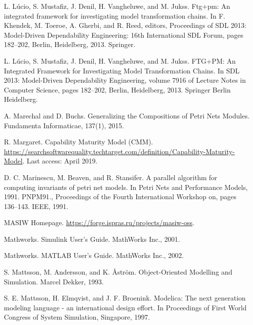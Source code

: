 \begin{description}[style=nextline,leftmargin=12mm,labelwidth=10mm,font=\normalfont]
\item[{[195]}] L. Lúcio, S. Mustafiz, J. Denil, H. Vangheluwe, and M. Jukss. Ftg+pm: An integrated framework for investigating model transformation chains. In F. Khendek, M. Toeroe, A. Gherbi, and R. Reed, editors, Proceedings of SDL 2013: Model-Driven Dependability Engineering: 16th International SDL Forum, pages 182–202, Berlin, Heidelberg, 2013. Springer.

\item[{[196]}] L. Lúcio, S. Mustafiz, J. Denil, H. Vangheluwe, and M. Jukss. FTG+PM: An Integrated Framework for Investigating Model Transformation Chains. In SDL 2013: Model-Driven Dependability Engineering, volume 7916 of Lecture Notes in Computer Science, pages 182–202, Berlin, Heidelberg, 2013. Springer Berlin Heidelberg.

\item[{[197]}] A. Marechal and D. Buchs. Generalizing the Compositions of Petri Nets Modules. Fundamenta Informaticae, 137(1), 2015.

\item[{[198]}] R. Margaret. Capability Maturity Model (CMM). \url{https://searchsoftwarequality.techtarget.com/definition/Capability-Maturity-Model}. Last access: April 2019.

\item[{[199]}] D. C. Marinescu, M. Beaven, and R. Stansifer. A parallel algorithm for computing invariants of petri net models. In Petri Nets and Performance Models, 1991. PNPM91., Proceedings of the Fourth International Workshop on, pages 136–143. IEEE, 1991.

\item[{[200]}] MASIW Homepage. \url{https://forge.ispras.ru/projects/masiw-oss}.

\item[{[201]}] Mathworks. Simulink User’s Guide. MathWorks Inc., 2001.

\item[{[202]}] Mathworks. MATLAB User’s Guide. MathWorks Inc., 2002.

\item[{[203]}] S. Mattsson, M. Andersson, and K. Åström. Object-Oriented Modelling and Simulation. Marcel Dekker, 1993.

\item[{[204]}] S. E. Mattsson, H. Elmqvist, and J. F. Broenink. Modelica: The next generation modeling language - an international design effort. In Proceedings of First World Congress of System Simulation, Singapore, 1997.


\end{description}
